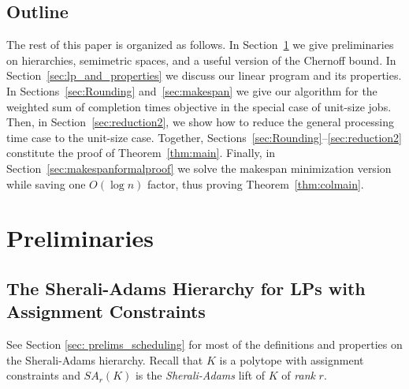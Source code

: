   
  
  
  
  
  
  
  \subsection{Outline}
  
  The rest of this paper is organized as follows.
  In Section~\ref{sec:preliminaries} we give preliminaries on hierarchies, semimetric spaces, and a useful version of the Chernoff bound.
  In Section~\ref{sec:lp_and_properties}
  we discuss our linear program and its properties.
  In Sections~\ref{sec:Rounding} and~\ref{sec:makespan}
  we give our algorithm for the weighted sum of completion times objective
  in the special case of unit-size jobs.
  Then, in Section~\ref{sec:reduction2},
  we show how to reduce the general processing time case
  to the unit-size case.
  Together,
  Sections~\ref{sec:Rounding}--\ref{sec:reduction2}
  constitute the proof of Theorem~\ref{thm:main}.
  Finally,
  in Section~\ref{sec:makespanformalproof}
  we solve the makespan minimization version
  while saving one $O(\log n)$ factor,
  thus proving
  Theorem~\ref{thm:colmain}.
  
  
  
  
  \section{Preliminaries}
  \label{sec:preliminaries}
  
  
  \subsection{The Sherali-Adams Hierarchy for LPs with Assignment Constraints\label{sec:SheraliAdamsHierarchy}}
  See Section \ref{sec: prelims_scheduling} for most of the definitions and properties on the Sherali-Adams hierarchy.
Recall that $K$ is a polytope with assignment constraints and $SA_r(K)$ is the \emph{Sherali-Adams} lift of $K$ of \emph{rank} $r$.


  
